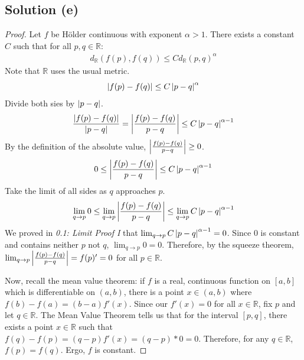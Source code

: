 \documentclass[11pt]{article}
\begin{document}
    \subsection{Solution (e)}
        \begin{proof}
            Let $f$ be H\"older continuous with exponent $\alpha > 1$.
            There exists a constant $C$ such that for all $p,q \in \mathbb{R}$:
            \begin{gather}
                d_\mathbb{R}(f(p),f(q)) \leq C d_\mathbb{R}(p,q)^\alpha
            \end{gather}
            Note that $\mathbb{R}$ uses the usual metric.
            \begin{equation}
                \left| f(p) - f(q) \right| \leq C \left| p - q \right|^\alpha
            \end{equation}
            Divide both sies by $\left| p - q \right|$.
            \begin{gather}
                \frac{\left| f(p) - f(q) \right|}{\left| p - q \right|}   =   \left| \frac{f(p) - f(q)}{p - q} \right|
                    \leq    C\left| p - q \right|^{\alpha - 1}
            \end{gather}
            By the definition of the absolute value, $\left| \frac{f(p) - f(q)}{p - q} \right| \geq 0$.
            \begin{gather}
                0   \leq    \left| \frac{f(p) - f(q)}{p - q} \right|
                    \leq    C\left| p - q \right|^{\alpha - 1}
            \end{gather}
            Take the limit of all sides as $q$ approaches $p$.
            \begin{gather}
                \lim_{q \to p} 0  
                    \leq    \lim_{q \to p} \left| \frac{f(p) - f(q)}{p - q} \right|
                    \leq    \lim_{q \to p} C\left| p - q \right|^{\alpha - 1}
            \end{gather}
            We proved in \textit{0.1: Limit Proof I} that $\lim_{q \to p} C\left| p - q \right|^{\alpha - 1} = 0$.
            Since $0$ is constant and contains neither $p$ not $q$, $\lim_{q \to p} 0 = 0$.
            Therefore, by the squeeze theorem, $\lim_{q \to p} \left| \frac{f(p) - f(q)}{p - q} \right| = f(p)' = 0$ for all $p \in \mathbb{R}$.

            Now, recall the mean value theorem: if $f$ is a real, continuous function on $[a,b]$ which is differentiable on $(a,b)$, there is a point $x \in (a,b)$ where $f(b) - f(a) = (b - a)f'(x)$.
            Since our $f'(x) = 0$ for all $x \in \mathbb{R}$, fix $p$ and let $q \in \mathbb{R}$. 
            The Mean Value Theorem tells us that for the interval $[p,q]$, there exists a point $x \in \mathbb{R}$ such that $f(q) - f(p) = (q - p)f'(x) = (q - p) * 0 = 0$.
            Therefore, for any $q \in \mathbb{R}$, $f(p) = f(q)$.
            Ergo, $f$ is constant.
        \end{proof}
\end{document}
